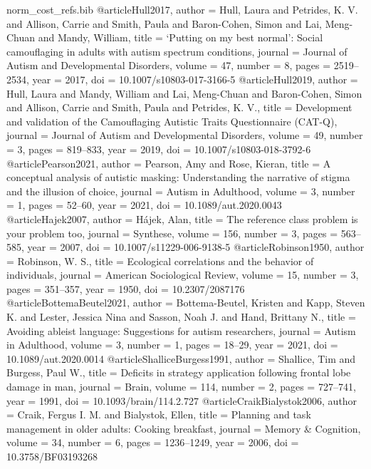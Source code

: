 \begin{filecontents}[overwrite]{norm_cost_refs.bib}
@article{Hull2017,
  author = {Hull, Laura and Petrides, K. V. and Allison, Carrie and Smith, Paula and Baron-Cohen, Simon and Lai, Meng-Chuan and Mandy, William},
  title = {`Putting on my best normal': Social camouflaging in adults with autism spectrum conditions},
  journal = {Journal of Autism and Developmental Disorders}, volume = {47}, number = {8}, pages = {2519--2534}, year = {2017},
  doi = {10.1007/s10803-017-3166-5}}
@article{Hull2019,
  author = {Hull, Laura and Mandy, William and Lai, Meng-Chuan and Baron-Cohen, Simon and Allison, Carrie and Smith, Paula and Petrides, K. V.},
  title = {Development and validation of the {Camouflaging Autistic Traits Questionnaire} ({CAT-Q})},
  journal = {Journal of Autism and Developmental Disorders}, volume = {49}, number = {3}, pages = {819--833}, year = {2019},
  doi = {10.1007/s10803-018-3792-6}}
@article{Pearson2021,
  author = {Pearson, Amy and Rose, Kieran},
  title = {A conceptual analysis of autistic masking: Understanding the narrative of stigma and the illusion of choice},
  journal = {Autism in Adulthood}, volume = {3}, number = {1}, pages = {52--60}, year = {2021},
  doi = {10.1089/aut.2020.0043}}
@article{Hajek2007,
  author = {H{\'a}jek, Alan},
  title = {The reference class problem is your problem too},
  journal = {Synthese}, volume = {156}, number = {3}, pages = {563--585}, year = {2007},
  doi = {10.1007/s11229-006-9138-5}}
@article{Robinson1950,
  author = {Robinson, W. S.},
  title = {Ecological correlations and the behavior of individuals},
  journal = {American Sociological Review}, volume = {15}, number = {3}, pages = {351--357}, year = {1950},
  doi = {10.2307/2087176}}
@article{BottemaBeutel2021,
  author = {Bottema-Beutel, Kristen and Kapp, Steven K. and Lester, Jessica Nina and Sasson, Noah J. and Hand, Brittany N.},
  title = {Avoiding ableist language: Suggestions for autism researchers},
  journal = {Autism in Adulthood}, volume = {3}, number = {1}, pages = {18--29}, year = {2021},
  doi = {10.1089/aut.2020.0014}}
@article{ShalliceBurgess1991,
  author = {Shallice, Tim and Burgess, Paul W.},
  title = {Deficits in strategy application following frontal lobe damage in man},
  journal = {Brain}, volume = {114}, number = {2}, pages = {727--741}, year = {1991},
  doi = {10.1093/brain/114.2.727}}
@article{CraikBialystok2006,
  author = {Craik, Fergus I. M. and Bialystok, Ellen},
  title = {Planning and task management in older adults: Cooking breakfast},
  journal = {Memory \& Cognition}, volume = {34}, number = {6}, pages = {1236--1249}, year = {2006},
  doi = {10.3758/BF03193268}}

\end{filecontents}
